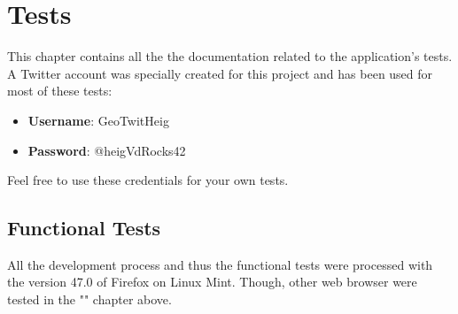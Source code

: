 \documentclass[a4paper,11pt]{report}
\begin{document}
\chapter{Tests}
This chapter contains all the the documentation related to the application's tests.\\
A Twitter account was specially created for this project and has been used for most of these tests:
\begin{itemize}
	\item \textbf{Username}: GeoTwitHeig
	\item \textbf{Password}: @heigVdRocks42
\end{itemize}
Feel free to use these credentials for your own tests.

\section{Functional Tests}
All the development process and thus the functional tests were processed with the version 47.0 of Firefox on Linux Mint. Though, other web browser were tested in the "" chapter above.
\end{document}
